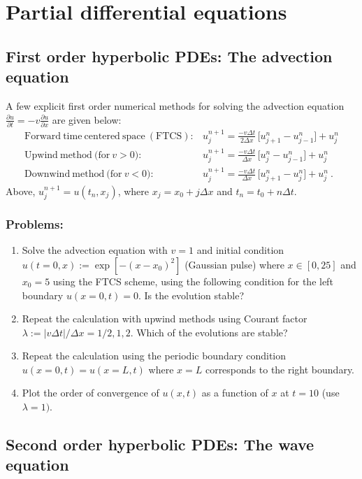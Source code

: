 \section{Partial differential equations}

\subsection{First order hyperbolic PDEs: The advection equation}

A few explicit first order numerical methods for solving the advection equation 
$\frac{\partial u}{\partial t} = -v \frac{\partial u}{\partial x}$
are given below: 
\begin{eqnarray}
\mathrm{Forward~time~centered~space~(FTCS):} & u^{n+1}_j = \frac{-v \Delta t}{2\Delta x} \, \Big[{u^n_{j+1} - u^n_{j-1}}\Big] + u^n_j \\
\mathrm{Upwind~method~(for~} v > 0): & u^{n+1}_j = \frac{-v \Delta t}{\Delta x} \, \Big[{u^n_{j} - u^n_{j-1}}\Big] + u^n_j \\
\mathrm{Downwind~method~(for~} v < 0): & u^{n+1}_j = \frac{-v \Delta t}{\Delta x} \, \Big[{u^n_{j+1} - u^n_{j}}\Big] + u^n_j~.
\end{eqnarray}
Above, $u^{n+1}_j = u(t_n, x_j)$, where $x_j = x_0 + j \Delta x$ and $t_n = t_0 + n \Delta t$.
\subsubsection{Problems:}
\begin{enumerate}
\item Solve the advection equation with $v = 1$ and initial condition $u(t=0,x) := \exp[-(x-x_0)^2]$ (Gaussian pulse) where $x \in [0, 25]$ and $x_0 = 5$ using the FTCS scheme, using the following condition for the left boundary $u(x=0,t) = 0$. Is the evolution stable?  
\item Repeat the calculation with upwind methods using Courant factor $\lambda := |v\Delta t|/\Delta x = 1/2, 1, 2$. Which of the evolutions are stable? 
\item Repeat the calculation using the periodic boundary condition $u(x=0, t) = u(x=L, t)$ where $x=L$ corresponds to the right boundary. 
\item Plot the order of convergence of $u(x,t)$ as a function of $x$ at $t = 10$ (use $\lambda = 1)$.   
\end{enumerate}

\subsection{Second order hyperbolic PDEs: The wave equation}

